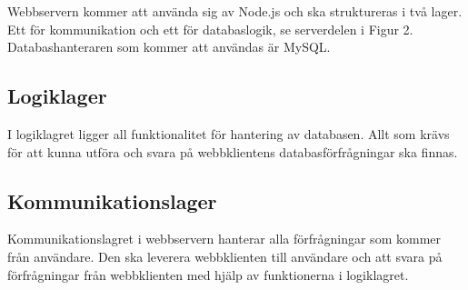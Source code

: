 \documentclass[a4paper,10pt]{article}
\begin{document}
Webbservern kommer att använda sig av Node.js och ska struktureras i två lager. Ett för kommunikation och ett för databaslogik, se serverdelen i Figur 2. Databashanteraren som kommer att användas är MySQL.

\subsection{Logiklager}
I logiklagret ligger all funktionalitet för hantering av databasen. Allt som krävs för att kunna utföra och svara på webbklientens databasförfrågningar ska finnas.

\subsection{Kommunikationslager}
Kommunikationslagret i webbservern hanterar alla förfrågningar som kommer från användare. Den ska leverera webbklienten till användare och att svara på förfrågningar från webbklienten med hjälp av funktionerna i logiklagret.



\end{document}
